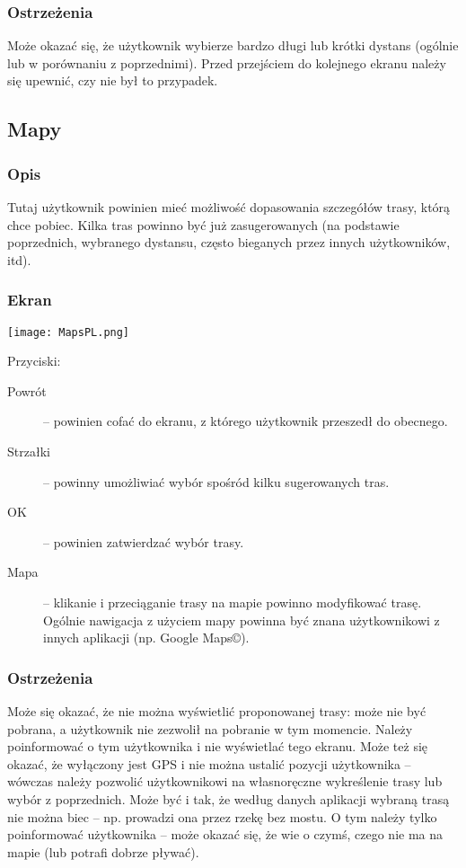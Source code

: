 \subsubsection{Ostrzeżenia}
\noindent Może okazać się, że użytkownik wybierze bardzo długi lub krótki dystans (ogólnie lub w porównaniu z poprzednimi). Przed przejściem do kolejnego ekranu należy się upewnić, czy nie był to przypadek.
\subsection{Mapy}
\subsubsection{Opis}
\noindent Tutaj użytkownik powinien mieć możliwość dopasowania szczegółów trasy, którą chce pobiec. Kilka tras powinno być już zasugerowanych (na podstawie poprzednich, wybranego dystansu, często bieganych przez innych użytkowników, itd).
\subsubsection{Ekran}
\begin{minipage}{0.5\textwidth}
  \label{M}
  \texttt{[image: MapsPL.png]}
\end{minipage}
\begin{minipage}{0.5\textwidth}
Przyciski:\\
\begin{description}
  \item[Powrót] -- powinien cofać do ekranu, z którego użytkownik przeszedł do obecnego.
  \item[Strzałki] -- powinny umożliwiać wybór spośród kilku sugerowanych tras.
  \item[OK] -- powinien zatwierdzać wybór trasy.
  \item[Mapa] -- klikanie i przeciąganie trasy na mapie powinno modyfikować trasę. Ogólnie nawigacja z użyciem mapy powinna być znana użytkownikowi z innych aplikacji (np. Google Maps©).
\end{description}
\end{minipage}
\subsubsection{Ostrzeżenia}
\noindent Może się okazać, że nie można wyświetlić proponowanej trasy: może nie być pobrana, a użytkownik nie zezwolił na pobranie w tym momencie. Należy poinformować o tym użytkownika i nie wyświetlać tego ekranu. Może też się okazać, że wyłączony jest GPS i nie można ustalić pozycji użytkownika -- wówczas należy pozwolić użytkownikowi na własnoręczne wykreślenie trasy lub wybór z poprzednich. Może być i tak, że według danych aplikacji wybraną trasą nie można biec -- np. prowadzi ona przez rzekę bez mostu. O tym należy tylko poinformować użytkownika -- może okazać się, że wie o czymś, czego nie ma na mapie (lub potrafi dobrze pływać).
